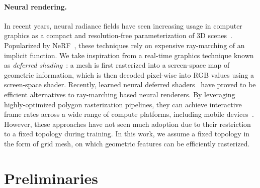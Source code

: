 \documentclass{article}
\theoremstyle{plain}
\theoremstyle{definition}
\theoremstyle{remark}
\begin{document}
\paragraph{Neural rendering.} In recent years, neural radiance fields have seen increasing usage in computer graphics as a compact and resolution-free parameterization of 3D scenes~\citep{mildenhall2021nerf, muller2022instant, li2023neuralangelo}.
Popularized by NeRF~\citep{mildenhall2021nerf}, these techniques rely on expensive ray-marching of an implicit function.
We take inspiration from a real-time graphics technique known as \textit{deferred shading}~\citep{deering1988triangle}: a mesh is first rasterized into a screen-space map of geometric information, which is then decoded pixel-wise into RGB values using a screen-space shader. 
Recently, learned neural deferred shaders~\citep{thies2019deferred, worchel2022multi, walker2023explicit} have proved to be efficient alternatives to ray-marching based neural renderers.
By leveraging highly-optimized polygon rasterization pipelines, they can achieve interactive frame rates across a wide range of compute platforms, including mobile devices~\citep{chen2023mobilenerf}.
However, these approaches have not seen much adoption due to their restriction to a fixed topology during training.
In this work, we assume a fixed topology in the form of grid mesh, on which geometric features can be efficiently rasterized. %

\section{Preliminaries}
\end{document}
